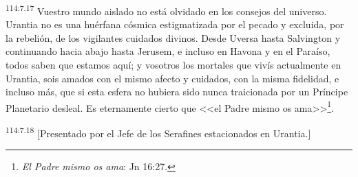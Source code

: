 \par
\textsuperscript{114:7.17} Vuestro mundo aislado no está olvidado en los consejos del universo. Urantia no es una huérfana cósmica estigmatizada por el pecado y excluida, por la rebelión, de los vigilantes cuidados divinos. Desde Uversa hasta Salvington y continuando hacia abajo hasta Jerusem, e incluso en Havona y en el Paraíso, todos saben que estamos aquí; y vosotros los mortales que vivís actualmente en Urantia, sois amados con el mismo afecto y cuidados, con la misma fidelidad, e incluso más, que si esta esfera no hubiera sido nunca traicionada por un Príncipe Planetario desleal. Es eternamente cierto que <<el Padre mismo os ama>>\footnote{\textit{El Padre mismo os ama}: Jn 16:27.}.

\par
\textsuperscript{114:7.18} [Presentado por el Jefe de los Serafines estacionados en Urantia.]